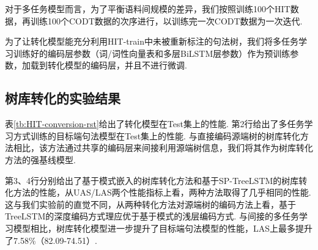 对于多任务模型而言，为了平衡语料间规模的差异，我们按照训练100个HIT数据，再训练100个CODT数据的次序进行，以训练完一次CODT数据为一次迭代.

为了让转化模型能充分利用HIT-train中未被重新标注的句法树，我们将多任务学习训练好的编码层参数（词/词性向量表和多层BiLSTM层参数）作为预训练参数，加载到转化模型的编码层，并且不进行微调.


\subsection{树库转化的实验结果}
表\ref{tb:HIT-conversion-rst}给出了转化模型在Test集上的性能. 第2行给出了多任务学习方式训练的目标端句法模型在Test集上的性能.
与直接编码源端树的树库转化方法相比，该方法通过共享的编码层来间接利用源端树信息，我们将其作为树库转化方法的强基线模型.

第3、4行分别给出了基于模式嵌入的树库转化方法和基于SP-TreeLSTM的树库转化方法的性能，从UAS/LAS两个性能指标上看，两种方法取得了几乎相同的性能. 这与我们实验前的直觉不同，从两种转化方法对源端树的编码方法上看，基于TreeLSTM的深度编码方式理应优于基于模式的浅层编码方式.
与间接的多任务学习模型相比，树库转化模型进一步提升了目标端句法模型的性能，LAS上最多提升了7.58\%（82.09-74.51）.

